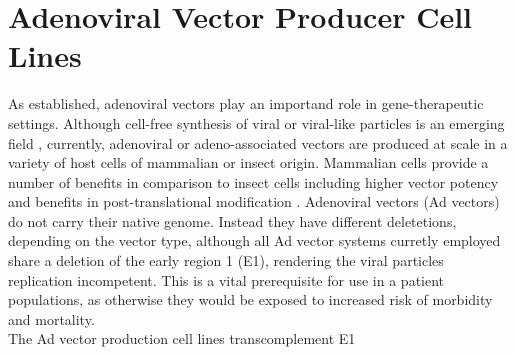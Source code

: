 \section{Adenoviral Vector Producer Cell Lines}
As established, adenoviral vectors play an importand role in gene-therapeutic settings. Although cell-free synthesis of viral or viral-like particles is an emerging field \cite{deukerAdenoAssociatedVirus52024}, currently, adenoviral or adeno-associated vectors are produced at scale in a variety of host cells of mammalian or insect origin. Mammalian cells provide a number of benefits in comparison to insect cells including higher vector potency and benefits in post-translational modification \cite{gilesSignificantDifferencesCapsid2023}. Adenoviral vectors (Ad vectors) do not carry their native genome. Instead they have different deletetions, depending on the vector type, although all Ad vector systems curretly employed share a deletion of the early region 1 (E1)\cite{sayedahmedCurrentUseAdenovirus2019}, rendering the viral particles replication incompetent. This is a vital prerequisite for use in a patient populations, as otherwise they would be exposed to increased risk of morbidity and mortality. \\
The Ad vector production cell lines transcomplement E1

